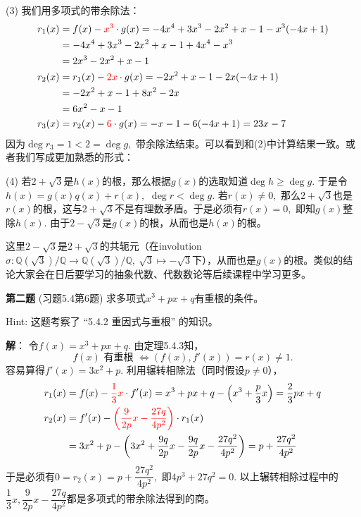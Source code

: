 \vspace{0.5em}

(3) 我们用多项式的带余除法：
\begin{align*}
r_1(x) & = f(x) - {\color{red} x^3} \cdot g(x) = - 4x^4 + 3x^3 - 2x^2 + x - 1 - x^3 (- 4x + 1) \\
& = - 4x^4 + 3x^3 - 2x^2 + x - 1 + 4x^4 - x^3 \\
& = 2x^3 - 2x^2 + x - 1 \\
r_2(x) & = r_1(x) - {\color{red} 2x} \cdot g(x) = - 2x^2 + x - 1 - 2x (- 4x + 1) \\
& = - 2x^2 + x - 1 + 8x^2 - 2x \\
& = 6x^2 - x - 1 \\
r_3(x) & = r_2(x) - {\color{red} 6} \cdot g(x) = - x - 1 - 6 (- 4x + 1) = 23 x - 7
\end{align*}
因为$\deg r_3 = 1 < 2 = \deg g,$ 带余除法结束。可以看到和(2)中计算结果一致。或者我们写成更加熟悉的形式：
\begin{center}
\end{center}

\vspace{0.5em}

(4) 若$2 + \sqrt{3}$是$h(x)$的根，那么根据$g(x)$的选取知道$\deg h \geqslant \deg g.$ 于是令$h(x) = g(x) q(x) + r(x),$ $\deg r < \deg g.$ 若$r(x) \neq 0,$ 那么$2 + \sqrt{3}$也是$r(x)$的根，这与$2 + \sqrt{3}$不是有理数矛盾。于是必须有$r(x) = 0,$ 即知$g(x)$整除$h(x).$ 由于$2 - \sqrt{3}$是$g(x)$的根，从而也是$h(x)$的根。

这里$2 - \sqrt{3}$是$2 + \sqrt{3}$的共轭元（在involution $\sigma: \mathbb{Q}(\sqrt{3}) / \mathbb{Q} \to \mathbb{Q}(\sqrt{3}) / \mathbb{Q}, ~ \sqrt{3} \mapsto -\sqrt{3}$下），从而也是$g(x)$的根。类似的结论大家会在日后要学习的抽象代数、代数数论等后续课程中学习更多。

\fi  %

\newpageorvspace

{\bf 第二题} (习题5.4第6题) 求多项式$x^3 + px + q$有重根的条件。

Hint: 这题考察了 ``5.4.2 重因式与重根'' 的知识。

\ifIncludeAnswer

\newpageorvspace

{\bf 解}： 令$f(x) = x^3 + px + q.$ 由定理5.4.3知，
$$f(x) \text{ 有重根 } \Longleftrightarrow \left( f(x), f'(x) \right) = r(x) \neq 1.$$
容易算得$f'(x) = 3x^2 + p.$ 利用辗转相除法（同时假设$p\neq 0$），
\begin{align*}
r_1(x) & = f(x) - {\color{red} \dfrac{1}{3}x} \cdot f'(x) = x^3 + px + q - \left( x^3 + \dfrac{p}{3}x \right) = \dfrac{2}{3}px + q \\
r_2(x) & = f'(x) - {\color{red} \left( \dfrac{9}{2p}x - \dfrac{27q}{4p^2} \right)} \cdot r_1(x) \\
& = 3x^2 + p - \left( 3x^2 + \dfrac{9q}{2p}x - \dfrac{9q}{2p}x - \dfrac{27q^2}{4p^2} \right) = p + \dfrac{27q^2}{4p^2}
\end{align*}
于是必须有$0 = r_2(x) = p + \dfrac{27q^2}{4p^2},$ 即$4p^3 + 27q^2 = 0.$ 以上辗转相除过程中的$\dfrac{1}{3}x, \dfrac{9}{2p}x - \dfrac{27q}{4p^2}$都是多项式的带余除法得到的商。

